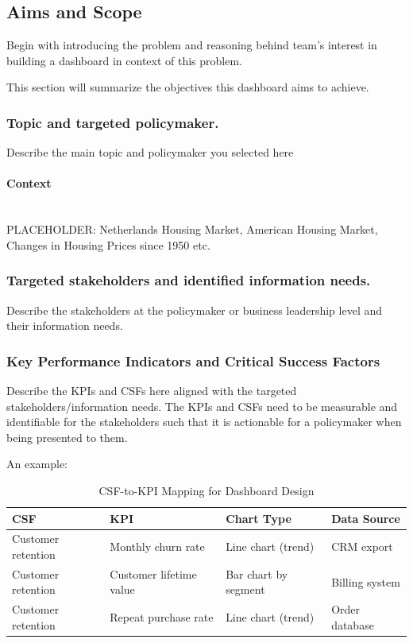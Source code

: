 \subsection{Aims and Scope}

Begin with introducing the problem and reasoning behind team's interest in building a dashboard in context of this problem. 

This section will summarize the objectives this dashboard aims to achieve. 

\subsubsection{Topic and targeted policymaker.}
Describe the main topic and policymaker you selected here

\paragraph{Context}
~\\ PLACEHOLDER: Netherlands Housing Market, American Housing Market, Changes in Housing Prices since 1950 etc. 


\subsubsection{Targeted stakeholders and identified information needs.}
Describe the stakeholders at the policymaker or business leadership level and their information needs.  

\subsubsection{Key Performance Indicators and Critical Success Factors}
Describe the KPIs and CSFs here aligned with the targeted stakeholders/information needs. The KPIs and CSFs need to be measurable and identifiable for the stakeholders such that it is actionable for a policymaker when being presented to them.

An example: 
\begin{table}[h]
\centering
\caption{CSF-to-KPI Mapping for Dashboard Design}
\begin{tabularx}{\textwidth}{l X X l}
\toprule
\textbf{CSF} & \textbf{KPI} & \textbf{Chart Type} & \textbf{Data Source}\\
\midrule
Customer retention & Monthly churn rate & Line chart (trend) & CRM export \\
Customer retention & Customer lifetime value & Bar chart by segment & Billing system \\
Customer retention & Repeat purchase rate & Line chart (trend) & Order database \\
\bottomrule
\end{tabularx}
\end{table}

